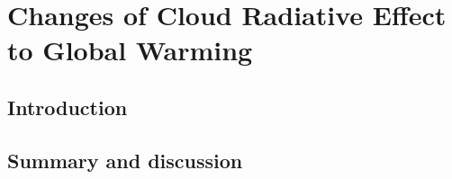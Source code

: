 \chapter{Changes of Cloud Radiative Effect to Global Warming}

\section{Introduction}

\section{Summary and discussion}